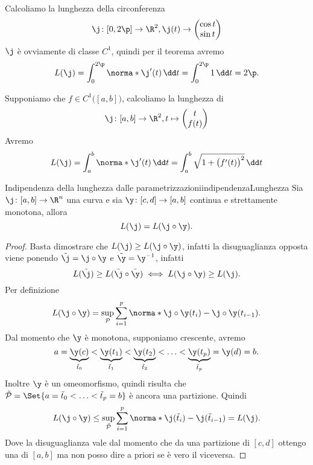 %
%
\begin{ese}
	Calcoliamo la lunghezza della circonferenza
	\[
		\j\colon [0,2\p] \to \R^2, \j(t) \to 	\begin{pmatrix}
			\cos t \\
			\sin t
		\end{pmatrix}
	\]
	\(\j\) è ovviamente di classe \(C^1\), quindi per il teorema avremo
	\[
		L(\j) = \int_0^{2\p}\norma*{\j'(t)}\,\dd t = \int_0^{2\p} 1\,\dd t = 2\p.
	\]
\end{ese}

\begin{ese}
	Supponiamo che \(f\in C^1\big([a,b]\big)\), calcoliamo la lunghezza di
	\[
		\j\colon [a,b]\to \R^2, t\mapsto 	\begin{pmatrix}
			t \\
			f(t)
		\end{pmatrix}
	\]
	Avremo
	\[
		L(\j) = \int_a^b \norma*{\j'(t)}\,\dd t = \int_a^b \sqrt{1+\big(f'(t)\big)^2}\,\dd t
	\]
\end{ese}

\begin{teor}{Indipendenza della lunghezza dalle parametrizzazioni}{indipendenzaLunghezza}
	Sia \(\j\colon [a,b] \to \R^n\) una curva e sia \(\y\colon [c,d]\to [a,b]\) continua e strettamente monotona, allora
	\[
		L(\j) = L(\j\circ\y).
	\]
\end{teor}

\begin{proof}
	Basta dimostrare che \(L(\j)\ge L(\j\circ\y)\), infatti la disuguaglianza opposta viene ponendo \(\tilde{\j}=\j\circ\y\) e \(\tilde{\y}=\y^{-1}\), infatti
	\[
		L(\tilde{\j})\ge L(\tilde{\j}\circ \tilde{\y}) \iff L(\j\circ \y)\ge L(\j).
	\]
	Per definizione
	\[
		L(\j\circ\y) = \sup_{\mathcal{P}} \sum_{i=1}^p \norma*{\j\circ\y (t_i)-\j\circ\y (t_{i-1})}.
	\]
	Dal momento che \(\y\) è monotona, supponiamo crescente, avremo
	\[
		a = \underbrace{\y(c)}_{\tilde{t}_0} < \underbrace{\y(t_1)}_{\tilde{t}_1} < \underbrace{\y(t_2)}_{\tilde{t}_2} < \ldots < \underbrace{\y(t_p)}_{\tilde{t}_p}=\y(d)=b.
	\]
	Inoltre \(\y\) è un omeomorfismo, quindi risulta che \(\tilde{\mathcal{P}} = \Set{a=\tilde{t}_0 < \ldots < \tilde{t}_p=b}\) è ancora una partizione.
	Quindi
	\[
		L(\j\circ\y) \le \sup_{\tilde{\mathcal{P}}} \sum_{i=1}^p \norma*{\j(\tilde{t}_i)-\j(\tilde{t}_{i-1})} = L(\j).
	\]
	Dove la disuguaglianza vale dal momento che da una partizione di \([c,d]\) ottengo una di \([a,b]\) ma non posso dire a priori se è vero il viceversa.
\end{proof}

